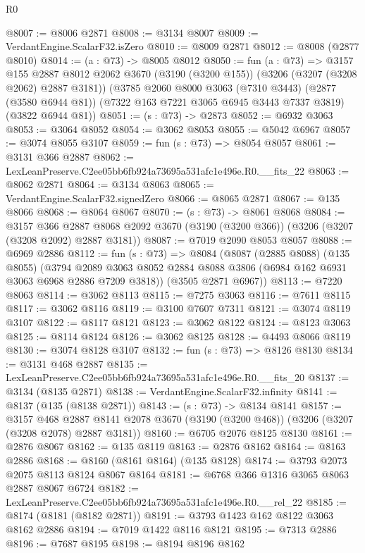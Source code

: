 \begin{lexlean}{R0}
\begin{coremodule}
@8007 := @8006 @2871
@8008 := @3134 @8007
@8009 := VerdantEngine.ScalarF32.isZero
@8010 := @8009 @2871
@8012 := @8008 (@2877 @8010)
@8014 := (a : @73) -> @8005 @8012
@8050 := fun (a : @73) =>
  @3157
    @155
    @2887
    @8012
    @2062
    @3670
    (@3190 (@3200 @155))
    (@3206 (@3207 (@3208 @2062) @2887 @3181))
    (@3785
      @2060
      @8000
      @3063
      (@7310 @3443)
      (@2877 (@3580 @6944 @81))
      (@7322 @163 @7221 @3065 @6945 @3443 @7337 @3819)
      (@3822 @6944 @81))
@8051 := (s : @73) -> @2873
@8052 := @6932 @3063
@8053 := @3064 @8052
@8054 := @3062 @8053
@8055 := @5042 @6967
@8057 := @3074 @8055 @3107
@8059 := fun (s : @73) => @8054 @8057
@8061 := @3131 @366 @2887
@8062 := LexLeanPreserve.C2ee05bb6fb924a73695a531afc1e496e.R0.__fits_22
@8063 := @8062 @2871
@8064 := @3134 @8063
@8065 := VerdantEngine.ScalarF32.signedZero
@8066 := @8065 @2871
@8067 := @135 @8066
@8068 := @8064 @8067
@8070 := (s : @73) -> @8061 @8068
@8084 := @3157
    @366
    @2887
    @8068
    @2092
    @3670
    (@3190 (@3200 @366))
    (@3206 (@3207 (@3208 @2092) @2887 @3181))
@8087 := @7019 @2090 @8053 @8057
@8088 := @6969 @2886
@8112 := fun (s : @73) =>
  @8084
    (@8087
      (@2885 @8088)
      (@135 @8055)
      (@3794 @2089 @3063 @8052 @2884 @8088 @3806 (@6984 @162 @6931 @3063 @6968 @2886 @7209 @3818))
      (@3505 @2871 @6967))
@8113 := @7220 @8063
@8114 := @3062 @8113
@8115 := @7275 @3063
@8116 := @7611 @8115
@8117 := @3062 @8116
@8119 := @3100 @7607 @7311
@8121 := @3074 @8119 @3107
@8122 := @8117 @8121
@8123 := @3062 @8122
@8124 := @8123 @3063
@8125 := @8114 @8124
@8126 := @3062 @8125
@8128 := @4493 @8066 @8119
@8130 := @3074 @8128 @3107
@8132 := fun (s : @73) => @8126 @8130
@8134 := @3131 @468 @2887
@8135 := LexLeanPreserve.C2ee05bb6fb924a73695a531afc1e496e.R0.__fits_20
@8137 := @3134 (@8135 @2871)
@8138 := VerdantEngine.ScalarF32.infinity
@8141 := @8137 (@135 (@8138 @2871))
@8143 := (s : @73) -> @8134 @8141
@8157 := @3157
    @468
    @2887
    @8141
    @2078
    @3670
    (@3190 (@3200 @468))
    (@3206 (@3207 (@3208 @2078) @2887 @3181))
@8160 := @6705 @2076 @8125 @8130
@8161 := @2876 @8067
@8162 := @135 @8119
@8163 := @2876 @8162
@8164 := @8163 @2886
@8168 := @8160 (@8161 @8164) (@135 @8128)
@8174 := @3793 @2073 @2075 @8113 @8124 @8067 @8164
@8181 := @6768 @366 @1316 @3065 @8063 @2887 @8067 @6724
@8182 := LexLeanPreserve.C2ee05bb6fb924a73695a531afc1e496e.R0.__rel_22
@8185 := @8174 (@8181 (@8182 @2871))
@8191 := @3793 @1423 @162 @8122 @3063 @8162 @2886
@8194 := @7019 @1422 @8116 @8121
@8195 := @7313 @2886
@8196 := @7687 @8195
@8198 := @8194 @8196 @8162

\end{coremodule}
\end{lexlean}
